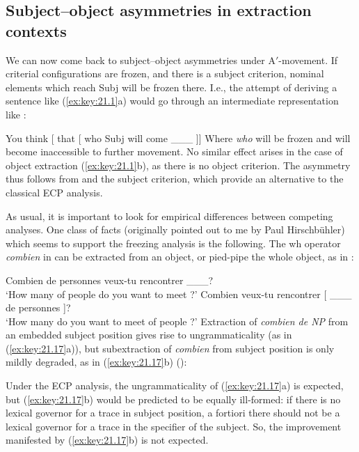 \documentclass[output=paper]{langsci/langscibook}
\begin{document}
\begin{exe}
\section{Subject--object asymmetries in extraction contexts}

We can now come back to subject--object asymmetries under A$'$-movement. If
criterial configurations are frozen, and there is a subject criterion, nominal
elements which reach Subj will be frozen there. I.e., the attempt of deriving a
sentence like (\ref{ex:key:21.1}a) would go through an intermediate
representation like :

\ea%
    \label{ex:key:21.15}
    You think [ that [ who Subj\tss{[$+$N]} will come \_\_\_ ]]
\z
%
Where \emph{who} will be frozen and will become inaccessible to further
movement. No similar effect arises in the case of object extraction
(\ref{ex:key:21.1}b), as there is no object criterion. The asymmetry thus
follows from  and the subject criterion, which provide
an alternative to the classical \gls{ECP}
analysis.

As usual, it is important to look for empirical differences between competing
analyses. One class of facts (originally pointed out to me by Paul
Hirschbühler) which seems to support the freezing analysis is the following.
The wh operator \emph{combien} in  can be extracted from an object,
or pied-pipe the whole object, as in :

\ea%
    \label{ex:key:21.16}
    \ea Combien de personnes veux-tu rencontrer \_\_\_?\\
        ‘How many of people do you want to meet ?’
    \ex Combien veux-tu rencontrer [ \_\_\_ de personnes ]?\\
        ‘How many do you want to meet of people ?’
    \z
\z
%
Extraction of \emph{combien de NP} from an embedded subject position gives rise
to ungrammaticality (as in (\ref{ex:key:21.17}a)), but subextraction of
\emph{combien} from subject position is only mildly degraded, as in
(\ref{ex:key:21.17}b) (\citealt{Obenauer1976,Kayne1984}):

\ea%
    \label{ex:key:21.17}
    \z
\z
%
Under the \gls{ECP} analysis, the ungrammaticality of (\ref{ex:key:21.17}a) is
expected, but (\ref{ex:key:21.17}b) would be predicted to be equally ill-formed:
if there is no lexical governor for a trace in subject position, a fortiori
there should not be a lexical governor for a trace in the specifier of the
subject. So, the improvement manifested by (\ref{ex:key:21.17}b) is not expected.


\end{exe}
\end{document}
